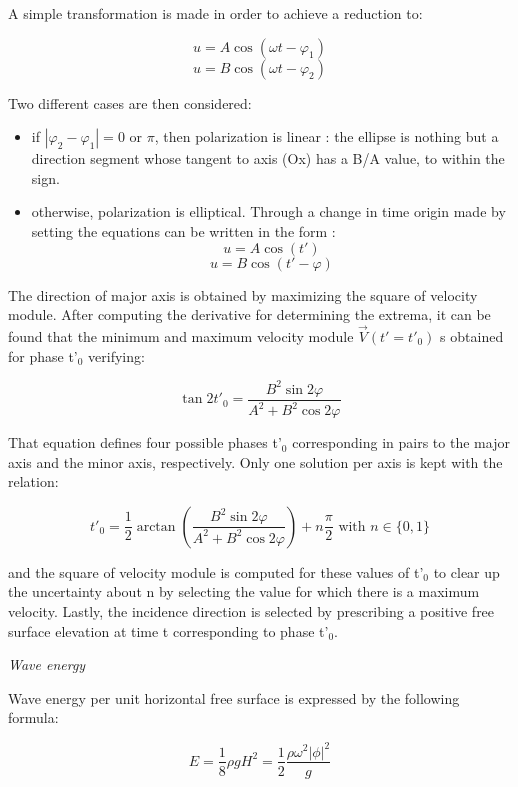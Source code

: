 A simple transformation is made in order to achieve a reduction to:

\[ u = A\cos(\omega t - \varphi_{1})\]
\[ u = B\cos(\omega t - \varphi_{2})\]

Two different cases are then considered:

\begin{itemize}
  \item  if $|\varphi_{2} - \varphi_{1}| = 0$ or $\pi$, then polarization is
    linear : the ellipse is nothing but a direction segment whose tangent to
    axis (Ox) has a B/A value, to within the sign.

\item  otherwise, polarization is elliptical. Through a change in time origin
  made by setting the equations can be written in the form :
\[ u = A\cos(t')\]
\[ u = B\cos(t' - \varphi)\]
\end{itemize}

The direction of major axis is obtained by maximizing the square of velocity
module. After computing the derivative for determining the extrema, it can be
found that the minimum and maximum velocity module $\overrightarrow{V}(t'=t'_{0})$ s obtained for phase
t'${}_{0}$ verifying:

\[ \tan 2t'_{0} = \frac{B^{2}\sin 2\varphi}{A^{2}+B^{2}\cos 2\varphi} \]


That equation defines four possible phases t'${}_{0}$ corresponding in pairs to the major axis and the minor axis, respectively. Only one solution per axis is kept with the relation:

\[ t'_{0} = \frac{1}{2}\arctan\left(\frac{B^{2}\sin2\varphi}{A^{2}+B^{2}\cos2\varphi}\right)+n\frac{\pi}{2} \text{ with } n \in \{0,1\}\]

and the square of velocity module is computed for these values of t'${}_{0}$ to
clear up the uncertainty about n by selecting the value for which there is a
maximum velocity. Lastly, the incidence direction is selected by prescribing a
positive free surface elevation at time t corresponding to phase t'${}_{0}$.

\textit{Wave energy}

Wave energy per unit horizontal free surface is expressed by the following formula:

\begin{equation}
  E = \frac{1}{8}\rho gH^{2} = \frac{1}{2}\frac{\rho\omega^{2}|\phi|^{2}}{g}
  \label{eq:3.32}
\end{equation}


